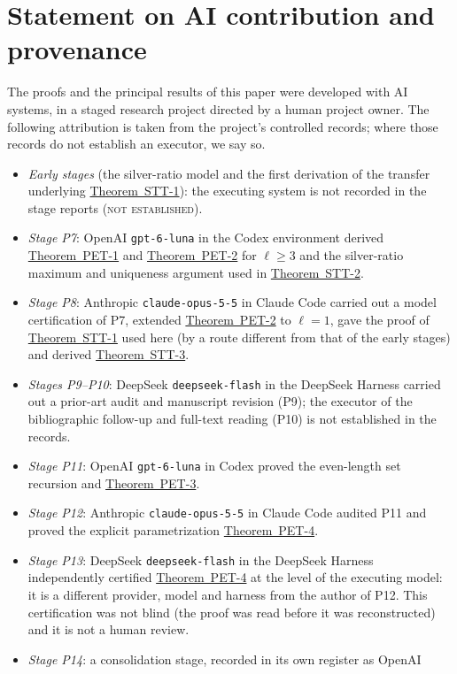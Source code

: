 \documentclass[11pt]{amsart}
\theoremstyle{definition}
\theoremstyle{remark}
\theoremstyle{plain}
\numberwithin{equation}{section}
\newcommand{\PETone}{\hyperref[thm:pet1]{Theorem~PET-1}}
\newcommand{\PETtwo}{\hyperref[thm:pet2]{Theorem~PET-2}}
\newcommand{\PETthree}{\hyperref[thm:pet3]{Theorem~PET-3}}
\newcommand{\PETfour}{\hyperref[thm:pet4]{Theorem~PET-4}}
\newcommand{\STTone}{\hyperref[thm:stt1]{Theorem~STT-1}}
\newcommand{\STTtwo}{\hyperref[thm:stt2]{Theorem~STT-2}}
\newcommand{\STTthree}{\hyperref[thm:stt3]{Theorem~STT-3}}
\begin{document}
\section*{Statement on AI contribution and provenance}

The proofs and the principal results of this paper were developed with AI systems, in a staged
research project directed by a human project owner.
The following attribution is taken from the project's controlled records; where those records do not
establish an executor, we say so.
\begin{itemize}[leftmargin=1.6em]
\item \emph{Early stages} (the silver-ratio model and the first derivation of the transfer underlying
\STTone): the executing system is not recorded in the stage reports (\textsc{not established}).
\item \emph{Stage P7}: OpenAI \texttt{gpt-6-luna} in the Codex environment derived \PETone{} and
\PETtwo{} for $\ell\ge3$ and the silver-ratio maximum and uniqueness argument used in \STTtwo.
\item \emph{Stage P8}: Anthropic \texttt{claude-opus-5-5} in Claude Code carried out a model
certification of P7, extended \PETtwo{} to $\ell=1$, gave the proof of \STTone{} used here (by a
route different from that of the early stages) and derived \STTthree.
\item \emph{Stages P9--P10}: DeepSeek \texttt{deepseek-flash} in the DeepSeek Harness carried out a
prior-art audit and manuscript revision (P9); the executor of the bibliographic follow-up and
full-text reading (P10) is not established in the records.
\item \emph{Stage P11}: OpenAI \texttt{gpt-6-luna} in Codex proved the even-length set recursion and
\PETthree.
\item \emph{Stage P12}: Anthropic \texttt{claude-opus-5-5} in Claude Code audited P11 and proved the
explicit parametrization \PETfour.
\item \emph{Stage P13}: DeepSeek \texttt{deepseek-flash} in the DeepSeek Harness independently
certified \PETfour{} at the level of the executing model: it is a different provider, model and
harness from the author of P12. This certification was not blind (the proof was read before it was
reconstructed) and it is not a human review.
\item \emph{Stage P14}: a consolidation stage, recorded in its own register as OpenAI

\end{itemize}
\end{document}
